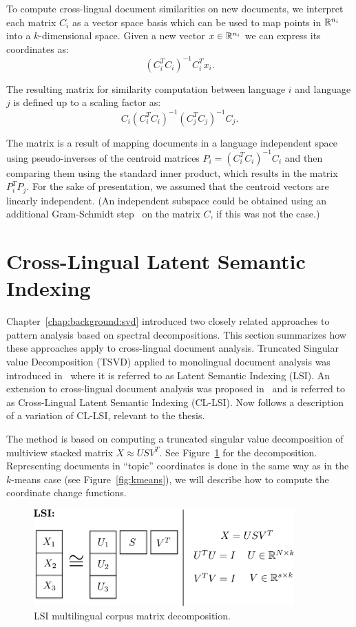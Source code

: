 To compute  cross-lingual document similarities on new documents, we interpret each matrix $C_i$ 
as a vector space basis which can be used to map points in $\mathbb{R}^{n_i}$ into a $k$-dimensional space. Given
a new vector $x \in \mathbb{R}^{n_i}$ we can express its coordinates as:
$$(C_i^T C_i)^{-1} C_i^T x_i.$$

The resulting matrix for similarity computation between language $i$ and language $j$
is defined up to a scaling factor as:
$$C_i(C_i^T C_i)^{-1} (C_j^T C_j)^{-1} C_j.$$

The matrix is a result of mapping documents in a language independent space using
pseudo-inverses of the centroid matrices $P_i = (C_i^T C_i)^{-1} C_i$ and then
comparing them using the standard inner product, which results in the matrix
$P_i^T P_j$. For the sake of presentation, we assumed that the centroid vectors
are linearly independent. (An independent subspace could be obtained using an
additional Gram-Schmidt step~\cite{golub} on the matrix $C$, if this was not the case.)

\section{Cross-Lingual Latent Semantic Indexing}\label{chap:crosslingual:LSI}

Chapter~\ref{chap:background:svd} introduced two closely related approaches
to pattern analysis based on spectral decompositions. This section summarizes
how these approaches apply to cross-lingual document analysis. Truncated Singular
value Decomposition (TSVD) applied to monolingual document analysis was introduced 
in~\cite{lsi} where it is referred to as Latent Semantic Indexing (LSI). An extension
to cross-lingual document analysis was proposed in~\cite{cl_lsi} and is referred to as
Cross-Lingual Latent Semantic Indexing (CL-LSI). Now follows a description of a
variation of CL-LSI, relevant to the thesis.

The method is based on computing a truncated singular value decomposition of 
multiview stacked matrix $X \approx U S V^T$. See Figure~\ref{fig:lsi} for the decomposition. 
Representing documents in ``topic'' coordinates is done in the same way as in the $k$-means case
(see Figure~\ref{fig:kmeans}), we will describe how to compute the coordinate change functions.

\begin{figure}[tbp]
\centering
\includegraphics[width=10cm]{figures/lsi.pdf}
\caption{\label{fig:lsi} LSI multilingual corpus matrix decomposition.}
\end{figure}


